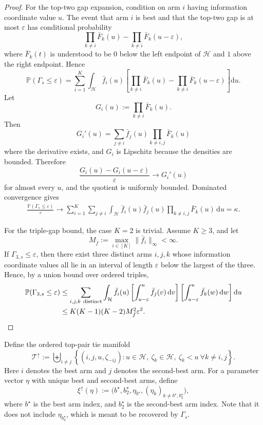 \documentclass[10pt]{article}
\newcommand{\dd}{\mathrm{d}}
\theoremstyle{plain}
\begin{document}
\begin{proof}
For the top-two gap expansion, condition on arm \(i\) having information coordinate
value \(u\).  The event that arm \(i\) is best and that the top-two gap is at most
\(\varepsilon\) has conditional probability
\[
    \prod_{k\neq i}\bar F_k(u)
    -
    \prod_{k\neq i}\bar F_k(u-\varepsilon),
\]
where \(\bar F_k(t)\) is understood to be \(0\) below the left endpoint of
\(\mathcal H\) and \(1\) above the right endpoint.  Hence
\[
    \mathbb P(\Gamma_s\le\varepsilon)
    =
    \sum_{i=1}^K
    \int_{\mathcal H}
        \bar f_i(u)
        \left[
            \prod_{k\neq i}\bar F_k(u)
            -
            \prod_{k\neq i}\bar F_k(u-\varepsilon)
        \right]\dd u.
\]
Let
\[
    G_i(u):=\prod_{k\neq i}\bar F_k(u).
\]
Then
\[
    G_i'(u)
    =
    \sum_{j\neq i}
    \bar f_j(u)\prod_{k\neq i,j}\bar F_k(u)
\]
where the derivative exists, and \(G_i\) is Lipschitz because the densities are
bounded.  Therefore
\[
    \frac{G_i(u)-G_i(u-\varepsilon)}{\varepsilon}
    \to
    G_i'(u)
\]
for almost every \(u\), and the quotient is uniformly bounded.  Dominated
convergence gives
\[
\begin{aligned}
    \frac{\mathbb P(\Gamma_s\le\varepsilon)}{\varepsilon}
    \to
    \sum_{i=1}^K
    \sum_{j\neq i}
    \int_{\mathcal H}
        \bar f_i(u)\bar f_j(u)
        \prod_{k\neq i,j}\bar F_k(u)\,\dd u  
    =\kappa .
\end{aligned}
\]

For the triple-gap bound, the case \(K=2\) is trivial.  Assume \(K\ge3\), and
let
\[
    M_{\bar{f}}:=\max_{i\in[K]}\|\bar f_i\|_\infty<\infty.
\]
If \(\Gamma_{3,s}\le\varepsilon\), then there exist three distinct arms
\(i,j,k\) whose information coordinate values all lie in an interval of length
\(\varepsilon\) below the largest of the three.  Hence, by a union bound over
ordered triples,
\[
\begin{aligned}
    \mathbb P(\Gamma_{3,s}\le\varepsilon)
    &\le
    \sum_{i,j,k\ {\rm distinct}}
    \int_{\mathcal H}
        \bar f_i(u)
        \left[
            \int_{u-\varepsilon}^{u}\bar f_j(v)\,\dd v
        \right]
        \left[
            \int_{u-\varepsilon}^{u}\bar f_k(w)\,\dd w
        \right]\dd u  \\
    &\le
    K(K-1)(K-2)M_{\bar{f}}^2\varepsilon^2. 
\end{aligned}
\]

\end{proof}

Define the ordered top-pair tie manifold
\[
    \mathcal T^\uparrow
    :=
    \biguplus_{i\neq j}
    \left\{
        (i,j,u,\zeta_{-ij}):
        u\in\mathcal H,\ \zeta_k\in\mathcal H,\ \zeta_k<u\ \forall k\neq i,j
    \right\}.
\]
Here \(i\) denotes the best arm and \(j\) denotes the second-best arm.  For a
parameter vector \(\eta\) with unique best and second-best arms, define
\[
    \xi^\uparrow(\eta)
    :=
    \bigl(b^\star,b^\star_2,\eta_{b^\star},(\eta_k)_{k\neq b^\star,b^\star_2}\bigr),
\]
where $b^\star$ is the best arm index, and \(b^\star_2\) is the second-best arm index. Note that it does not include $\eta_{b^\star_2}$, which is meant to be recovered by $\Gamma_s$.
\end{document}
